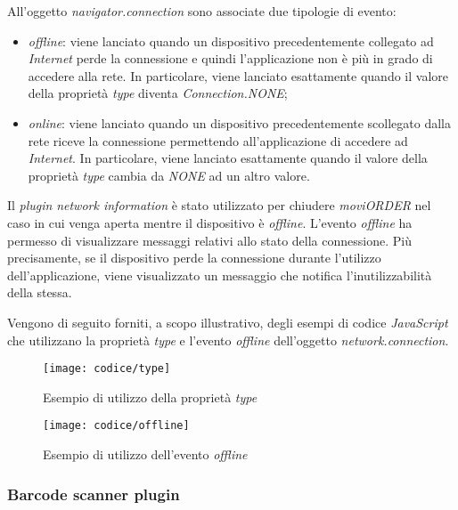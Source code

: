 All'oggetto \textit{navigator.connection} sono associate due tipologie di evento:
\begin{itemize}
	\item \textit{offline}: viene lanciato quando un dispositivo precedentemente collegato ad \textit{Internet} perde la connessione e quindi l'applicazione non è più in grado di accedere alla rete. In particolare, viene lanciato esattamente quando il valore della proprietà \textit{type} diventa \textit{Connection.NONE};
	\item \textit{online}: viene lanciato quando un dispositivo precedentemente scollegato dalla rete riceve la connessione permettendo all'applicazione di accedere ad \textit{Internet}. In particolare, viene lanciato esattamente quando il valore della proprietà \textit{type} cambia da \textit{NONE} ad un altro valore.
\end{itemize}
Il \textit{plugin} \textit{network information} è stato utilizzato per chiudere \textit{moviORDER} nel caso in cui venga aperta mentre il dispositivo è \textit{offline}. L'evento \textit{offline} ha permesso di visualizzare messaggi relativi allo stato della connessione. Più precisamente, se il dispositivo perde la connessione durante l'utilizzo dell'applicazione, viene visualizzato un messaggio che notifica l'inutilizzabilità della stessa.

Vengono di seguito forniti, a scopo illustrativo, degli esempi di codice \textit{JavaScript} che utilizzano la proprietà \textit{type} e l'evento \textit{offline} dell'oggetto \textit{network.connection}.

\begin{figure}[!h] 
    \centering 
    \texttt{[image: codice/type]} 
    \caption{Esempio di utilizzo della proprietà \textit{type}}
\end{figure}

\begin{figure}[!h] 
    \centering 
    \texttt{[image: codice/offline]} 
    \caption{Esempio di utilizzo dell'evento \textit{offline}}
\end{figure}
\subsubsection{Barcode scanner plugin}

